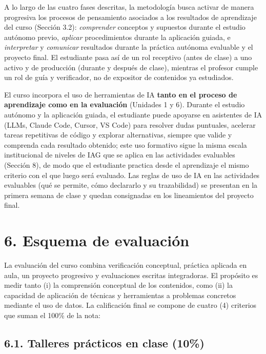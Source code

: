\documentclass[11pt,a4paper]{article}
\begin{document}
A lo largo de las cuatro fases descritas, la metodología busca activar de manera progresiva los procesos de pensamiento asociados a los resultados de aprendizaje del curso (Sección 3.2): \textit{comprender} conceptos y supuestos durante el estudio autónomo previo, \textit{aplicar} procedimientos durante la aplicación guiada, e \textit{interpretar} y \textit{comunicar} resultados durante la práctica autónoma evaluable y el proyecto final. El estudiante pasa así de un rol receptivo (antes de clase) a uno activo y de producción (durante y después de clase), mientras el profesor cumple un rol de guía y verificador, no de expositor de contenidos ya estudiados.

\vspace{0.3cm}

El curso incorpora el uso de herramientas de IA \textbf{tanto en el proceso de aprendizaje como en la evaluación} (Unidades 1 y 6). Durante el estudio autónomo y la aplicación guiada, el estudiante puede apoyarse en asistentes de IA (LLMs, Claude Code, Cursor, VS Code) para resolver dudas puntuales, acelerar tareas repetitivas de código y explorar alternativas, siempre que valide y comprenda cada resultado obtenido; este uso formativo sigue la misma escala institucional de niveles de IAG que se aplica en las actividades evaluables (Sección 8), de modo que el estudiante practica desde el aprendizaje el mismo criterio con el que luego será evaluado. Las reglas de uso de IA en las actividades evaluables (qué se permite, cómo declararlo y su trazabilidad) se presentan en la primera semana de clase y quedan consignadas en los lineamientos del proyecto final.


\section*{6. Esquema de evaluación}

La evaluación del curso combina verificación conceptual, práctica aplicada en aula, un proyecto progresivo y evaluaciones escritas integradoras. El propósito es medir tanto (i) la comprensión conceptual de los contenidos, como (ii) la capacidad de aplicación de técnicas y herramientas a problemas concretos mediante el uso de datos. La calificación final se compone de cuatro (4) criterios que suman el 100\% de la nota:

\subsection*{6.1. Talleres prácticos en clase (10\%)}
\end{document}
